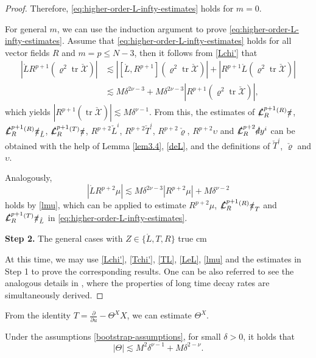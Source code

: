 \documentclass[11pt,twoside]{article}
\def\f{\frac}
\def\Lies{\slashed{\mathcal{L}}}
\def\p{\partial}
\def\pis{\slashed{\pi}}
\begin{document}
\begin{proof}
Therefore, \eqref{eq:higher-order-L-infty-estimates} holds for $m=0$.

For general $m$, we can use the induction argument to prove \eqref{eq:higher-order-L-infty-estimates}. Assume that \eqref{eq:higher-order-L-infty-estimates} holds for all vector fields $R$ and $m=p \leq N-3$, then it follows from \eqref{Lchi'} that
\begin{equation*}
\begin{split}
|\mathring{L}R^{p+1}(\varrho^2\operatorname{tr}\check{\mathscr{X}})| &\lesssim |[\mathring{L}, R^{p+1}](\varrho^2\operatorname{tr}\check{\mathscr{X}})| + |R^{p+1}\mathring{L}(\varrho^2\operatorname{tr}\check{\mathscr{X}})| \\
&\lesssim M\delta^{2\nu-3} + M\delta^{2\nu-3}|R^{p+1}(\varrho^2\operatorname{tr}\check{\mathscr{X}})|,
\end{split}
\end{equation*}
which yields $|R^{p+1}(\operatorname{tr}\check{\mathscr{X}})| \lesssim M\delta^{\nu-1}$. From this, the estimates of $\Lies_{R}^{p+1} {}^{(R)}\pis$, $\Lies_{R}^{p+1} {}^{(R)}\pis_{\mathring{L}}$, $\Lies_{R}^{p+1} {}^{(T)}\pis$, $R^{p+2}\check{L}^i$, $R^{p+2}\check{T}^i$, $R^{p+2}\check{\varrho}$, $R^{p+2}\upsilon$ and $\Lies_{R}^{p+2}\slashed{d}y^i$ can be obtained with the help of Lemma \ref{lem3.4}, \eqref{deL}, and the definitions of $\check{T}^i$, $\check{\varrho}$ and $\upsilon$.

Analogously,
\[
|\mathring{L}R^{p+2}\mu| \lesssim M\delta^{2\nu-3}|R^{p+2}\mu| + M\delta^{\nu-2}
\]
holds by \eqref{lmu}, which can be applied to estimate $R^{p+2}\mu$, $\Lies_{R}^{p+1} {}^{(R)}\pis_T$ and $\Lies_{R}^{p+1} {}^{(T)}\pis_{\mathring{L}}$
in \eqref{eq:higher-order-L-infty-estimates}.

\textbf{Step 2.} The general cases with $Z \in \{\mathring{L}, T, R\}$
 true cm

At this time,
we may use \eqref{Lchi'}, \eqref{Tchi'}, \eqref{TL}, \eqref{LeL}, \eqref{lmu} and the estimates in Step 1 to prove
the corresponding results. One can be also referred to see the analogous details in \cite[Propositions 6.2 and 6.3]{Ding3},
where the properties of long time decay rates are simultaneously derived.
\end{proof}
From the identity $T=\f{\partial}{\p u}-\Theta^XX$, we can estimate $\Theta^X$.
\begin{lemma}\label{eXi}
 Under the assumptions \eqref{bootstrap-assumptions}, for small $\delta>0$, it holds that
 \begin{equation}\label{Xi}
 |\Theta|\lesssim M^2\delta^{\nu-1}+M\delta^{2-\nu}.
 \end{equation}
\end{lemma}
\end{document}
